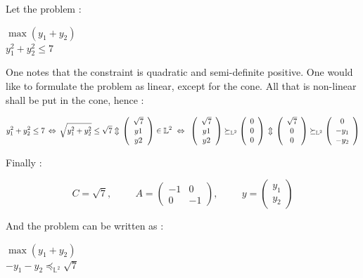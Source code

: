 \documentclass[10pt,a4paper]{article}
\begin{document}
\begin{example}
Let the problem :
\begin{center}
$\max (y_1+y_2)$ \\
$y_1^2+y_2^2 \leq 7$
\end{center}

One notes that the constraint is quadratic and semi-definite positive. One would like to formulate the problem as linear, except for the cone. All that is non-linear shall be put in the cone, hence : 
\begin{center}
\[
y_1^2+y_2^2 \leq 7 \, 
\Leftrightarrow \, 
\sqrt{y_1^2+y_2^2} \leq \sqrt{7} \\ \vspace{0.5cm}
\Updownarrow \\ \vspace{0.5cm}

\left( \begin{array}{c}
\sqrt7 \\
y1\\
y2 \end{array} \right) 
\in \mathbb{L}^2 \
\Leftrightarrow \, 
\
\left( \begin{array}{c}
\sqrt7 \\
y1\\
y2 \end{array} \right) 
\succeq_{ \mathbb{L}^2}
\left( \begin{array}{c}
0\\
0\\
0\\\end{array} \right)  \\ \vspace{0.5cm}
\Updownarrow \\ \vspace{0.5cm}


\left( \begin{array}{c}
\sqrt7 \\
0\\
0 \end{array} \right) 
\succeq_{ \mathbb{L}^2}
\left( \begin{array}{c}
0 \\
-y_1\\
-y_2 \end{array} \right) 
\] 
\end{center}

Finally :

\begin{center}
\[
C =\sqrt7, 
\hspace{1cm}
A = \left( \begin{array}{cc}
-1 & 0 \\
0 & -1 \end{array} \right), 
\hspace{1cm}
y = \left( \begin{array}{c}
y_1 \\
y_2 \end{array} \right)
\]
\end{center}
And the problem can be written as : 
\begin{center}
$\max (y_1+y_2)$ \\
$-y_1-y_2 \preceq_{\mathbb{L}^2} \sqrt7$



\end{center}
\end{example}
\end{document}
